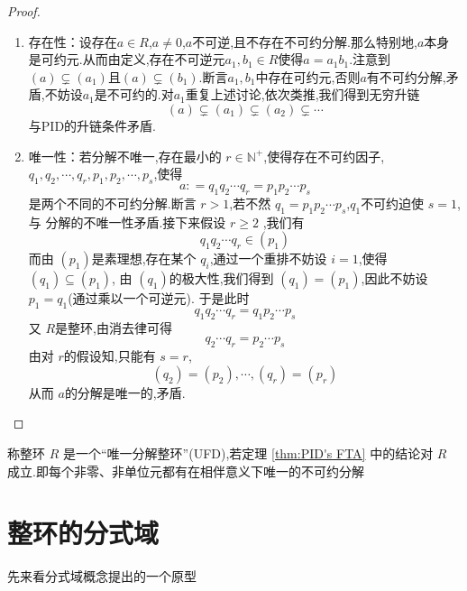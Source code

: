 \documentclass[lang=cn,12pt,color=green,fontset=none,pad]{elegantbook}
\begin{document}
\begin{proof}
    \begin{enumerate}
        \item  存在性：设存在$a \in R$,$a \neq 0$,$a$不可逆,且不存在不可约分解.那么特别地,$a$本身是可约元.从而由定义,存在不可逆元$a_{1},b_{1} \in R$使得$a=a_{1}b_{1}$.注意到$\left( a \right)\subsetneq \left( a_{1} \right)$且$\left( a \right)\subsetneq\left( b_{1} \right)$.断言$a_{1},b_{1}$中存在可约元,否则$a$有不可约分解,矛盾,不妨设$a_{1}$是不可约的.对$a_{1}$重复上述讨论,依次类推,我们得到无穷升链 $$ \left( a \right) \subsetneq\left( a_{1} \right) \subsetneq\left( a_{2} \right)  \subsetneq{\cdots}$$与PID的升链条件矛盾.
        \item 唯一性：若分解不唯一,存在最小的 $ r \in  \mathbb{N}^{+ } $,使得存在不可约因子, $ q_1,q_2,\cdots,q_r  ,p_1,p_2,\cdots,p_s $,使得 $$
        a : = q_1 q_2 \cdots q_r= p_1 p_2 \cdots p_s
        $$  是两个不同的不可约分解.断言 $ r> 1  $,若不然 $ q_1= p_1 p_2 \cdots p_s $,$ q_1    $不可约迫使 $  s = 1    $,与 分解的不唯一性矛盾.接下来假设 $ r \ge  2 $ ,我们有 $$
        q_1 q_2 \cdots q_r \in  \left( p_1 \right) 
        $$而由 $ \left( p_1  \right)  $是素理想,存在某个 $ q_i $,通过一个重排不妨设 $ i= 1 $,使得 $ \left( q_1 \right)\subseteq \left( p_1 \right)   $,    
        由 $ \left( q_1 \right)  $的极大性,我们得到 $ \left( q_1    \right)= \left( p_1 \right)   $,因此不妨设 $ p_1= q_1 $(通过乘以一个可逆元).
        于是此时 $$
       q_1 q_2 \cdots q_r=q_1 p_2\cdots p_{s}
        $$又 $ R $是整环,由消去律可得 $$
        q_2 \cdots q_{r}= p_2 \cdots p_{s}
        $$由对 $ r  $的假设知,只能有 $ s= r   $,  $$
        \left( q_2   \right)= \left( p_2 \right),\cdots , \left( q_{r} \right)= \left(  p_{r} \right)    
        $$      从而 $ a $的分解是唯一的,矛盾. 
    \end{enumerate}
    
  
\end{proof}

\begin{definition}
    称整环 $ R $ 是一个“唯一分解整环”(UFD),若定理 \ref{thm:PID's FTA} 中的结论对 $ R $ 成立.即每个非零、非单位元都有在相伴意义下唯一的不可约分解
\end{definition}

\section{整环的分式域}

先来看分式域概念提出的一个原型
\end{document}

